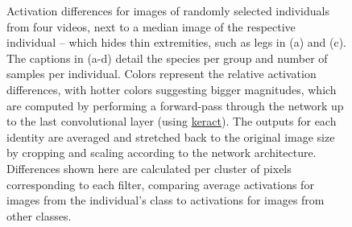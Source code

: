 \documentclass[9pt,lineno]{elife}
\begin{document}
\begin{figure}[h]
\centering
    \caption{Activation differences for images of randomly selected individuals from four videos, next to a median image of the respective individual -- which hides thin extremities, such as legs in (a) and (c). The captions in (a-d) detail the species per group and number of samples per individual. Colors represent the relative activation differences, with hotter colors suggesting bigger magnitudes, which are computed by performing a forward-pass through the network up to the last convolutional layer (using \href{https://github.com/philipperemy/keract}{keract}). The outputs for each identity are averaged and stretched back to the original image size by cropping and scaling according to the network architecture. Differences shown here are calculated per cluster of pixels corresponding to each filter, comparing average activations for images from the individual's class to activations for images from other classes.}
    

\end{figure}
\end{document}
